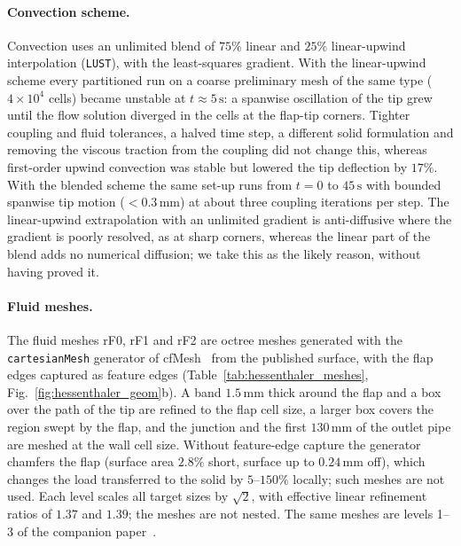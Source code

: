 \paragraph{Convection scheme.}
Convection uses an unlimited blend of $75\%$ linear and $25\%$ linear-upwind interpolation (\texttt{LUST}), with the least-squares gradient.
With the linear-upwind scheme every partitioned run on a coarse preliminary mesh of the same type ($4\times10^{4}$ cells) became unstable at $t \approx 5\,\mathrm{s}$: a spanwise oscillation of the tip grew until the flow solution diverged in the cells at the flap-tip corners. Tighter coupling and fluid tolerances, a halved time step, a different solid formulation and removing the viscous traction from the coupling did not change this, whereas first-order upwind convection was stable but lowered the tip deflection by $17\%$. With the blended scheme the same set-up runs from $t = 0$ to $45\,\mathrm{s}$ with bounded spanwise tip motion ($< 0.3\,\mathrm{mm}$) at about three coupling iterations per step.
The linear-upwind extrapolation with an unlimited gradient is anti-diffusive where the gradient is poorly resolved, as at sharp corners, whereas the linear part of the blend adds no numerical diffusion; we take this as the likely reason, without having proved it.

\paragraph{Fluid meshes.}
The fluid meshes rF0, rF1 and rF2 are octree meshes generated with the \texttt{cartesianMesh} generator of cfMesh~\citep{Juretic2015cfMesh} from the published surface, with the flap edges captured as feature edges (Table~\ref{tab:hessenthaler_meshes}, Fig.~\ref{fig:hessenthaler_geom}b).
A band $1.5\,\mathrm{mm}$ thick around the flap and a box over the path of the tip are refined to the flap cell size, a larger box covers the region swept by the flap, and the junction and the first $130\,\mathrm{mm}$ of the outlet pipe are meshed at the wall cell size.
Without feature-edge capture the generator chamfers the flap (surface area $2.8\%$ short, surface up to $0.24\,\mathrm{mm}$ off), which changes the load transferred to the solid by $5$--$150\%$ locally; such meshes are not used.
Each level scales all target sizes by $\sqrt{2}$, with effective linear refinement ratios of $1.37$ and $1.39$; the meshes are not nested.
The same meshes are levels 1--3 of the companion paper~\citep{CardiffBatistic2026QM}.

